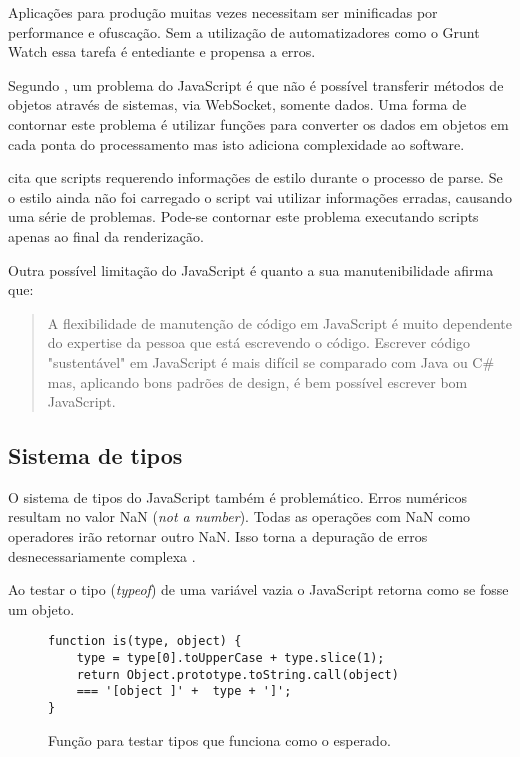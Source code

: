 Aplicações para produção muitas vezes necessitam ser minificadas por
performance e ofuscação. Sem a utilização de automatizadores como o
Grunt Watch essa tarefa é entediante e propensa a erros.

Segundo \citet{htmlResearchJournal}, um problema do JavaScript é que
não é possível transferir métodos de objetos através de sistemas,
via WebSocket, somente dados. Uma forma de contornar este problema é
utilizar funções para converter os dados em objetos em cada ponta do
processamento mas isto adiciona complexidade ao software.

\citet{howBrowsersWork} cita que scripts requerendo informações de
estilo durante o processo de parse. Se o estilo ainda não foi carregado
o script vai utilizar informações erradas, causando uma série de
problemas. Pode-se contornar este problema executando scripts apenas 
ao final da renderização.


Outra possível limitação do JavaScript é quanto a sua manutenibilidade \citet{html5Tradeoffs} afirma que:
\begin{quote}
A flexibilidade de manutenção de código em JavaScript é muito
dependente do expertise da pessoa que está escrevendo o código.
Escrever código "sustentável" em JavaScript é mais difícil se
comparado com Java ou C\# mas, aplicando bons padrões de design, é bem
possível escrever bom JavaScript.
\end{quote}

\subsection{Sistema de tipos}

O sistema de tipos do JavaScript também é problemático.
Erros numéricos resultam no valor NaN (\textit{not a number}).
Todas as operações com NaN como operadores irão retornar outro
NaN. Isso torna a depuração de erros desnecessariamente complexa
\autocite{html5mostwanted}.

Ao testar o tipo (\textit{typeof}) de uma variável vazia o JavaScript
retorna como se fosse um objeto.

\begin{figure}[H]
\centering
\begin{verbatim}
function is(type, object) {
    type = type[0].toUpperCase + type.slice(1);
    return Object.prototype.toString.call(object)
    === '[object ]' +  type + ']';
}
\end{verbatim}
\caption{Função para testar tipos que funciona como o esperado.}
\label{fig:fixJSTypes}
\end{figure}

